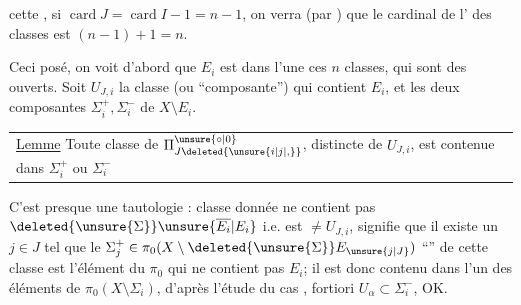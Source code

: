 cette , si $\operatorname{card}J=\operatorname{card}I-1=n-1$, on verra (par ) que le cardinal de l' des classes est $(n-1)+1=n$.

Ceci posé, on voit d'abord que $E_i$ est dans l'une   ces $n$ classes, qui sont des ouverts. Soit $U_{J,i}$ la classe (ou ``composante'') qui contient $E_i$, et  les deux composantes $\Sigma_i^+,\Sigma_i^-$ de $X\setminus E_i$.

\noindent\begin{tabular}{@{}|p{.91\linewidth}@{}}
\uline{Lemme} Toute classe de $\Pi_{J\deleted{\unsure{i|j|,}}}^{\unsure{\circ|0}}$, distincte de $U_{J,i}$, est contenue dans $\Sigma_i^+$ ou $\Sigma_i^-$
\end{tabular}

C'est presque une tautologie :    classe donnée  ne contient pas $\deleted{\unsure{\Sigma}}\unsure{\overline{E_i}|E_i}$ i.e. est $\ne U_{J,i}$, signifie que il existe un $j\in J$ tel que le $\Sigma_j^+\in\pi_0(X\setminus \deleted{\unsure{\Sigma}}E_{\unsure{j|J}})$  ``'' de cette classe  est l'élément du $\pi_0$ qui ne contient pas $E_i$; il est donc contenu dans l'un des éléments  de $\pi_0(X\setminus\Sigma_i)$, d'après l'étude du cas  ,   fortiori $U_\alpha\subset\Sigma_i^-$, OK.
